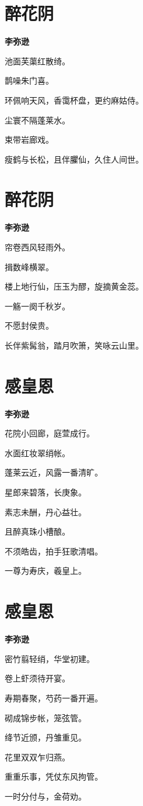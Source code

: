 \documentclass[12pt,a4paper]{ctexbook}
\begin{document}
\section{醉花阴}
\textbf{李弥逊}\par\vspace{0.5em}
池面芙蕖红散绮。\par
鹊噪朱门喜。\par
环佩响天风，香霭杯盘，更约麻姑侍。\par
尘寰不隔蓬莱水。\par
束带岩廊戏。\par
瘦鹤与长松，且伴臞仙，久住人间世。\par

\section{醉花阴}
\textbf{李弥逊}\par\vspace{0.5em}
帘卷西风轻雨外。\par
揖数峰横翠。\par
楼上地行仙，压玉为醪，旋摘黄金蕊。\par
一觞一阕千秋岁。\par
不愿封侯贵。\par
长伴紫髯翁，踏月吹箫，笑咏云山里。\par

\section{感皇恩}
\textbf{李弥逊}\par\vspace{0.5em}
花院小回廊，庭萱成行。\par
水面红妆翠绡帐。\par
蓬莱云近，风露一番清旷。\par
星郎来碧落，长庚象。\par
素志未酬，丹心益壮。\par
且醉真珠小槽酿。\par
不须皓齿，拍手狂歌清唱。\par
一尊为寿庆，羲皇上。\par

\section{感皇恩}
\textbf{李弥逊}\par\vspace{0.5em}
密竹翦轻绡，华堂初建。\par
卷上虾须待开宴。\par
寿期春聚，芍药一番开遍。\par
砌成锦步帐，笼弦管。\par
绛节近颁，丹雏重见。\par
花里双双乍归燕。\par
重重乐事，凭仗东风拘管。\par
一时分付与，金荷劝。\par
\end{document}
